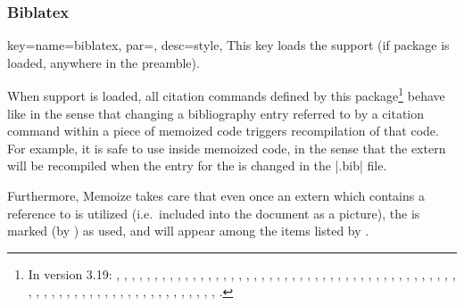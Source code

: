 \documentclass[a4paper,11pt]{article}
\begin{document}
\subsubsection{Biblatex}

\begin{doc}{
    key={name=biblatex, par=, desc=style},
  }
  This key loads the  support (if package  is
  loaded, anywhere in the preamble).

  When  support is loaded, all citation commands defined by this
  package\footnote{In  version 3.19: , ,
    , , , ,
    , , , ,
    , , , , ,
    , , , ,
    , , , ,
    , , , ,
    , , , ,
    , , , , ,
    , , , , ,
    , , , ,
    , , , ,
    , , , ,
    , , , ,
    , , , ,
    , , , ,
    , , , ,
    , .} behave like  in the sense that
  changing a bibliography entry referred to by a citation command within a
  piece of memoized code triggers recompilation of that code.  For example, it
  is safe to use  inside
  memoized code, in the sense that the extern will be recompiled when the entry
  for the  is changed in the |.bib| file.

  Furthermore, Memoize takes care that even once an extern which contains a
  reference to  is utilized (i.e.\ included into the
  document as a picture), the  is marked (by ) as
  used, and will appear among the items listed by .


\end{doc}
\end{document}
